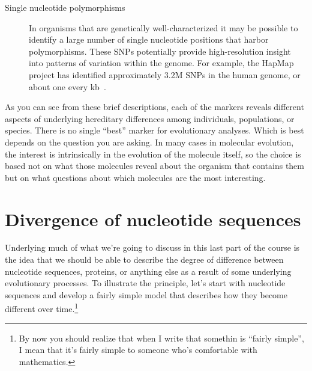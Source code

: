 \documentclass[12pt]{article}
\begin{document}
\begin{description}
\item[Single nucleotide polymorphisms] In organisms that are
  genetically well-characterized it may be possible to identify a
  large number of single nucleotide positions that harbor
  polymorphisms. These SNPs potentially provide high-resolution
  insight into patterns of variation within the genome. For example,
  the HapMap project has identified approximately 3.2M SNPs in the
  human genome, or about one every kb~\cite{HapMap-2007}.

\end{description}

As you can see from these brief descriptions, each of the markers
reveals different aspects of underlying hereditary differences among
individuals, populations, or species. There is no single ``best''
marker for evolutionary analyses. Which is best depends on the
question you are asking. In many cases in molecular evolution, the
interest is intrinsically in the evolution of the molecule itself, so
the choice is based not on what those molecules reveal about the
organism that contains them but on what questions about which
molecules are the most interesting.

\section*{Divergence of nucleotide sequences}

Underlying much of what we're going to discuss in this last part of
the course is the idea that we should be able to describe the degree
of difference between nucleotide sequences, proteins, or anything else
as a result of some underlying evolutionary processes. To illustrate
the principle, let's start with nucleotide sequences and develop a
fairly simple model that describes how they become different over
time.\footnote{By now you should realize that when I write that
  somethin is ``fairly simple'', I mean that it's fairly simple to
  someone who's comfortable with mathematics.}
\end{document}
